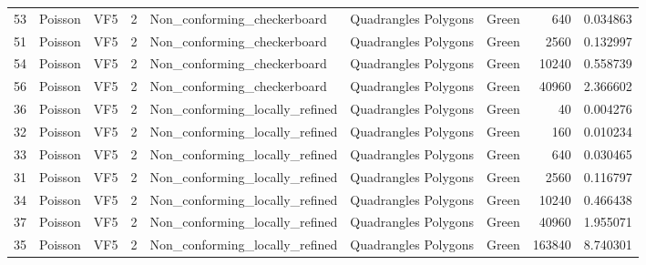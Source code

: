 \begin{tabular}{lllrlllrr}
53 &      Poisson &                               VF5 &               2 &     Non\_conforming\_checkerboard &  Quadrangles Polygons  &      Green &                      640 &                         0.034863 \\
51 &      Poisson &                               VF5 &               2 &     Non\_conforming\_checkerboard &  Quadrangles Polygons  &      Green &                     2560 &                         0.132997 \\
54 &      Poisson &                               VF5 &               2 &     Non\_conforming\_checkerboard &  Quadrangles Polygons  &      Green &                    10240 &                         0.558739 \\
56 &      Poisson &                               VF5 &               2 &     Non\_conforming\_checkerboard &  Quadrangles Polygons  &      Green &                    40960 &                         2.366602 \\
36 &      Poisson &                               VF5 &               2 &  Non\_conforming\_locally\_refined &  Quadrangles Polygons  &      Green &                       40 &                         0.004276 \\
32 &      Poisson &                               VF5 &               2 &  Non\_conforming\_locally\_refined &  Quadrangles Polygons  &      Green &                      160 &                         0.010234 \\
33 &      Poisson &                               VF5 &               2 &  Non\_conforming\_locally\_refined &  Quadrangles Polygons  &      Green &                      640 &                         0.030465 \\
31 &      Poisson &                               VF5 &               2 &  Non\_conforming\_locally\_refined &  Quadrangles Polygons  &      Green &                     2560 &                         0.116797 \\
34 &      Poisson &                               VF5 &               2 &  Non\_conforming\_locally\_refined &  Quadrangles Polygons  &      Green &                    10240 &                         0.466438 \\
37 &      Poisson &                               VF5 &               2 &  Non\_conforming\_locally\_refined &  Quadrangles Polygons  &      Green &                    40960 &                         1.955071 \\
35 &      Poisson &                               VF5 &               2 &  Non\_conforming\_locally\_refined &  Quadrangles Polygons  &      Green &                   163840 &                         8.740301 \\

\end{tabular}
